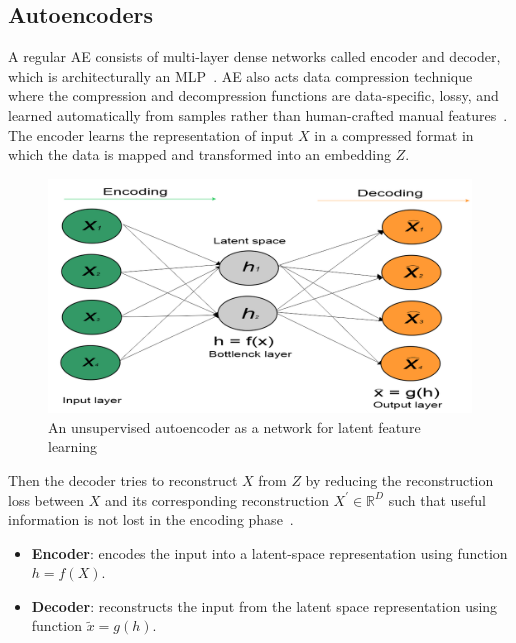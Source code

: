 \subsection{Autoencoders}
\label{preli:AEs}
A regular AE consists of multi-layer dense networks called encoder and decoder, which is architecturally an MLP~\cite{karimDLTF2018}. AE also acts data compression technique where the compression and decompression functions are data-specific, lossy, and learned automatically from samples rather than human-crafted manual features~\cite{karimDLTF2018}. The encoder learns the representation of input $X$ in a compressed format in which the data is mapped and transformed into an embedding $Z$.  

\begin{figure}[h]
    \centering
    \includegraphics[scale=0.5]{images/ae.png}
    \caption{An unsupervised autoencoder as a network for latent feature learning~\cite{karimDLTF2018}}
    \label{fig:ae_theory1}
    \vspace{-2mm}
\end{figure}

\hspace*{3.5mm} Then the decoder tries to reconstruct $X$ from $Z$ by reducing the reconstruction loss between $X$ and its corresponding reconstruction $X^{\prime} \in \mathbb{R}^{D}$ such that useful information is not lost in the encoding phase~\cite{KarimIEEEAccess2019}.

\vspace{-2mm}
\begin{itemize}[noitemsep]
    \item \textbf{Encoder}: encodes the input into a latent-space representation using function $h = f(X)$.
    \item \textbf{Decoder}: reconstructs the input from the latent space representation using function $\tilde{x} = g(h)$. 
\end{itemize}
\vspace{-2mm}

